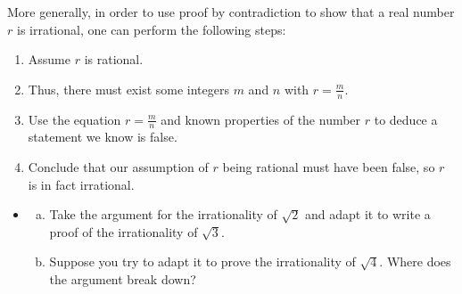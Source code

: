 \documentclass[11pt]{article}
\newcounter{tasknumb}
\newcommand{\tasknumb}[1]{\refstepcounter{tasknumb}\textmd{\textbf{$\fbox{$\fbox{Task \thetasknumb}$}$}}#1}
\newenvironment{task}[1][]%
 {\begin{itemize}
 \item[\tasknumb{#1}]  }
{
    \end{itemize}    }%
\begin{document}






More generally, in order to use proof by contradiction to show that a real number $r$ is irrational, one can perform the following steps:

\begin{enumerate}
\item Assume $r$ is rational.
\item Thus, there must exist some integers $m$ and $n$ with $r=\frac{m}{n}$.
\item Use the equation $r=\frac{m}{n}$ and known properties of the number $r$ to deduce a statement we know is false. 
\item Conclude that our assumption of $r$ being rational must have been false, so $r$ is in fact irrational.
\end{enumerate}

\begin{task}\begin{enumerate}[(a)]
    \item Take the argument for the irrationality of $\sqrt{2}$ and adapt it to write a proof of the irrationality of $\sqrt{3}$.
    \item Suppose you try to adapt it to prove the irrationality of $\sqrt{4}$.  Where does the argument break down?
\end{enumerate}

\end{task}
\end{document}
